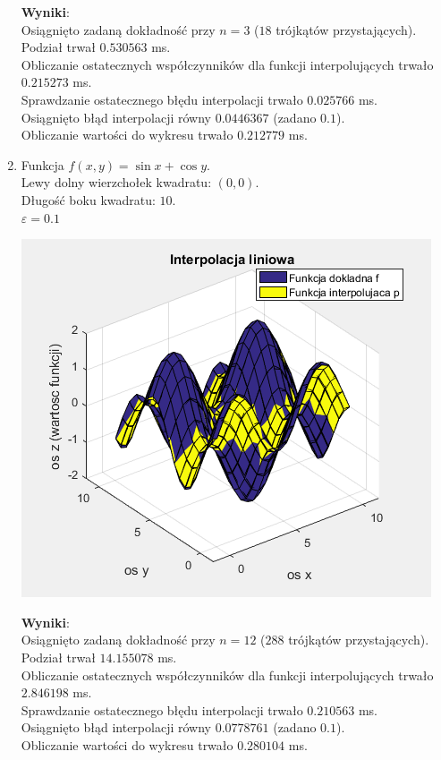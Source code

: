\documentclass[12pt]{article}
\begin{document}
\begin{enumerate}[label=\textbf{Przykład \arabic*}]
		\textbf{Wyniki}:\\
		Osiągnięto zadaną dokładność przy $n = 3$ ($18$ trójkątów przystających).\\
		Podział trwał $0.530563$ ms.\\
		Obliczanie ostatecznych współczynników dla funkcji interpolujących trwało $0.215273$ ms.\\
		Sprawdzanie ostatecznego błędu interpolacji trwało $0.025766$ ms.\\
		Osiągnięto błąd interpolacji równy $0.0446367$ (zadano $0.1$).\\
		Obliczanie wartości do wykresu trwało $0.212779$ ms.
		\pagebreak
		
		
		
		\item
		Funkcja $f(x, y) = \sin{x} + \cos{y}$.\\
		Lewy dolny wierzchołek kwadratu: $(0, 0)$.\\
		Długość boku kwadratu: $10$.\\
		$\varepsilon = 0.1$
		
		\includegraphics[]{images/example-4.png}
		
		\textbf{Wyniki}:\\
		Osiągnięto zadaną dokładność przy $n = 12$ ($288$ trójkątów przystających).\\
		Podział trwał $14.155078$ ms.\\
		Obliczanie ostatecznych współczynników dla funkcji interpolujących trwało $2.846198$ ms.\\
		Sprawdzanie ostatecznego błędu interpolacji trwało $0.210563$ ms.\\
		Osiągnięto błąd interpolacji równy $0.0778761$ (zadano $0.1$).\\
		Obliczanie wartości do wykresu trwało $0.280104$ ms.
		\pagebreak
		

\end{enumerate}
\end{document}
